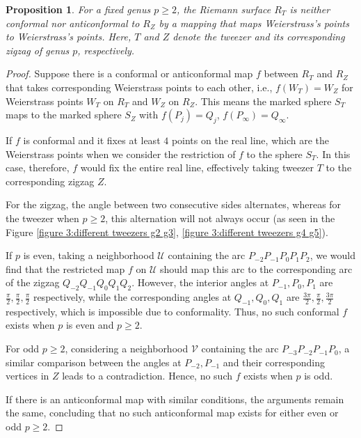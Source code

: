 \documentclass[12pt,epsfig,tikz,multi]{amsart}
\newtheorem{prop}{Proposition}[section]
\numberwithin{equation}{section}
\begin{document}
\begin{prop}\label{prof:RiemannsurfaceComprasion}
   For a fixed genus $p \geq 2$, the Riemann surface $R_T$ is neither conformal nor anticonformal to $R_Z$ by a mapping that maps Weierstrass's points to Weierstrass's points. Here, $T$ and $Z$ denote the tweezer and its corresponding zigzag of genus $p$, respectively.

\end{prop}
\begin{proof}
Suppose there is a conformal or anticonformal map $f$ between $R_T$ and $R_Z$ that takes corresponding Weierstrass points to each other, i.e., $f(W_T) = W_Z$ for Weierstrass points $W_T$ on $R_T$ and $W_Z$ on $R_Z$. This means the marked sphere $S_T$ maps to the marked sphere $S_Z$ with $f(P_j)=Q_j$, $f(P_{\infty})= Q_\infty$. 


If $f$ is conformal and it fixes at least $4$ points on the real line, which are the Weierstrass points when we consider the restriction of $f$ to the sphere $S_{T}$. In this case, therefore, $f$ would fix the entire real line, effectively taking tweezer $T$ to the corresponding zigzag $Z$.

For the zigzag,  the angle between two consecutive sides alternates, whereas for the tweezer when $p\geq 2$, this alternation will not always occur (as seen in the Figure \ref{figure 3:different tweezers g2 g3}, \ref{figure 3:different tweezers g4 g5}).

If $p$ is even, taking a neighborhood $\mathcal{U}$ containing the arc $P_{-2}P_{-1}P_{0}P_1P_2$, we would find that the restricted map  $f$  on $\mathcal{U}$ should map this arc to the corresponding arc of the zigzag $Q_{-2}Q_{-1}Q_0Q_{1}Q_2$. However, the interior angles at $P_{-1},P_{0},P_{1}$ are $\frac{\pi}{2},\frac{\pi}{2},\frac{\pi}{2}$ respectively, while the corresponding angles at $Q_{-1},Q_{0},Q_{1}$ are $\frac{3\pi}{2},\frac{\pi}{2},\frac{3\pi}{2}$ respectively, which is impossible due to conformality. Thus, no such conformal $f$ exists when $p$ is even and $p\geq 2$.

For odd $p\geq 2$, considering a neighborhood $\mathcal{V}$  containing the arc $P_{-3}P_{-2}P_{-1}P_0$, a similar comparison between the angles at $P_{-2},P_{-1}$ and their corresponding vertices in $Z$ leads to a contradiction. Hence, no such $f$ exists when $p$ is odd.

If there is an anticonformal map with similar conditions, the arguments remain the same, concluding that no such anticonformal map exists for either even or odd $p\geq 2$.
\end{proof}
\end{document}

